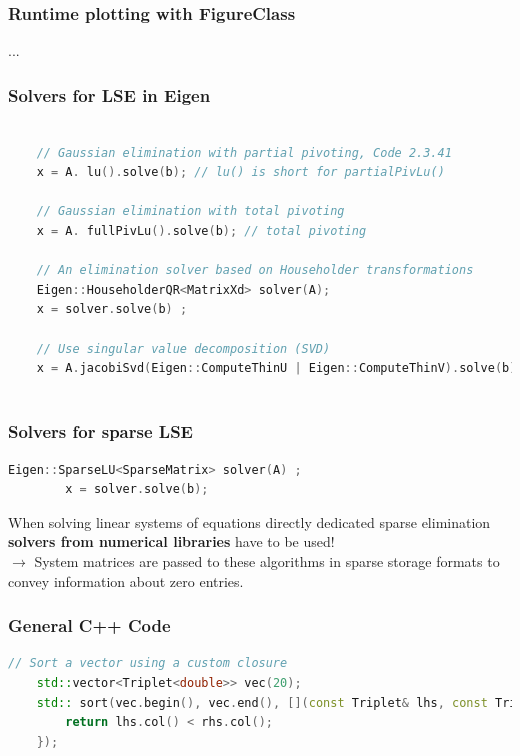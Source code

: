 \documentclass[12pt, a4paper]{article}
\begin{document}
\subsubsection{Runtime plotting with FigureClass}
...

\subsubsection{Solvers for LSE in Eigen }
	\begin{lstlisting}[language=C++]
	
	// Gaussian elimination with partial pivoting, Code 2.3.41
	x = A. lu().solve(b); // lu() is short for partialPivLu()
	
	// Gaussian elimination with total pivoting
	x = A. fullPivLu().solve(b); // total pivoting
	
	// An elimination solver based on Householder transformations		
	Eigen::HouseholderQR<MatrixXd> solver(A);
	x = solver.solve(b) ;	
	
	// Use singular value decomposition (SVD)	
	x = A.jacobiSvd(Eigen::ComputeThinU | Eigen::ComputeThinV).solve(b);	
		
	\end{lstlisting}


\subsubsection{Solvers for sparse LSE}
	\begin{lstlisting}[language=C++]
		Eigen::SparseLU<SparseMatrix> solver(A) ;
		x = solver.solve(b);
	\end{lstlisting}

\begin{tcolorbox}
	When solving linear systems of equations directly dedicated sparse elimination \textbf{solvers from numerical libraries} have to be used! \\
	
	$\rightarrow$ System matrices are passed to these algorithms in sparse storage formats to convey information about zero entries.	
\end{tcolorbox}


\subsubsection{General C++ Code}
\begin{lstlisting}[language=C++]
	// Sort a vector using a custom closure
	std::vector<Triplet<double>> vec(20);
	std:: sort(vec.begin(), vec.end(), [](const Triplet& lhs, const Triplet& rhs) {
		return lhs.col() < rhs.col(); 
	});
\end{lstlisting}
\end{document}
